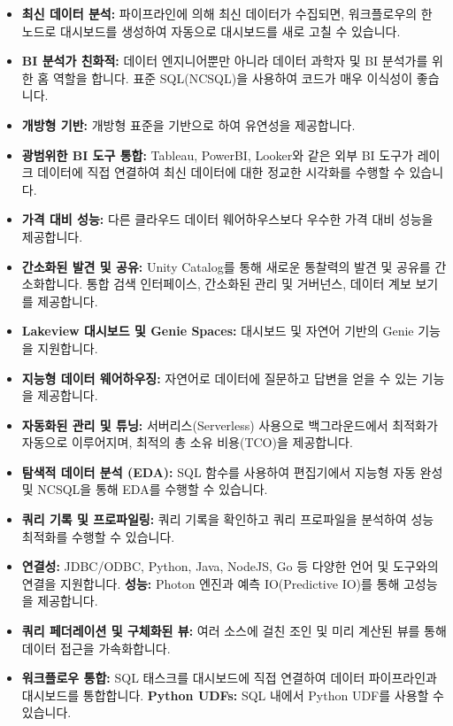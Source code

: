 \documentclass[11pt,a4paper]{article}
\theoremstyle{definition}
\begin{document}
\begin{itemize}
    \item \textbf{최신 데이터 분석:} 파이프라인에 의해 최신 데이터가 수집되면, 워크플로우의 한 노드로 대시보드를 생성하여 자동으로 대시보드를 새로 고칠 수 있습니다.
    \item \textbf{BI 분석가 친화적:} 데이터 엔지니어뿐만 아니라 데이터 과학자 및 BI 분석가를 위한 홈 역할을 합니다. 표준 SQL(NCSQL)을 사용하여 코드가 매우 이식성이 좋습니다.
    \item \textbf{개방형 기반:} 개방형 표준을 기반으로 하여 유연성을 제공합니다.
    \item \textbf{광범위한 BI 도구 통합:} Tableau, PowerBI, Looker와 같은 외부 BI 도구가 레이크 데이터에 직접 연결하여 최신 데이터에 대한 정교한 시각화를 수행할 수 있습니다.
    \item \textbf{가격 대비 성능:} 다른 클라우드 데이터 웨어하우스보다 우수한 가격 대비 성능을 제공합니다.
    \item \textbf{간소화된 발견 및 공유:} Unity Catalog를 통해 새로운 통찰력의 발견 및 공유를 간소화합니다. 통합 검색 인터페이스, 간소화된 관리 및 거버넌스, 데이터 계보 보기를 제공합니다.
    \item \textbf{Lakeview 대시보드 및 Genie Spaces:} 대시보드 및 자연어 기반의 Genie 기능을 지원합니다.
    \item \textbf{지능형 데이터 웨어하우징:} 자연어로 데이터에 질문하고 답변을 얻을 수 있는 기능을 제공합니다.
    \item \textbf{자동화된 관리 및 튜닝:} 서버리스(Serverless) 사용으로 백그라운드에서 최적화가 자동으로 이루어지며, 최적의 총 소유 비용(TCO)을 제공합니다.
    \item \textbf{탐색적 데이터 분석 (EDA):} SQL 함수를 사용하여 편집기에서 지능형 자동 완성 및 NCSQL을 통해 EDA를 수행할 수 있습니다.
    \item \textbf{쿼리 기록 및 프로파일링:} 쿼리 기록을 확인하고 쿼리 프로파일을 분석하여 성능 최적화를 수행할 수 있습니다.
    \item \textbf{연결성:} JDBC/ODBC, Python, Java, NodeJS, Go 등 다양한 언어 및 도구와의 연결을 지원합니다.
    \textbf{성능:} Photon 엔진과 예측 IO(Predictive IO)를 통해 고성능을 제공합니다.
    \item \textbf{쿼리 페더레이션 및 구체화된 뷰:} 여러 소스에 걸친 조인 및 미리 계산된 뷰를 통해 데이터 접근을 가속화합니다.
    \item \textbf{워크플로우 통합:} SQL 태스크를 대시보드에 직접 연결하여 데이터 파이프라인과 대시보드를 통합합니다.
    \textbf{Python UDFs:} SQL 내에서 Python UDF를 사용할 수 있습니다.

\end{itemize}
\end{document}
